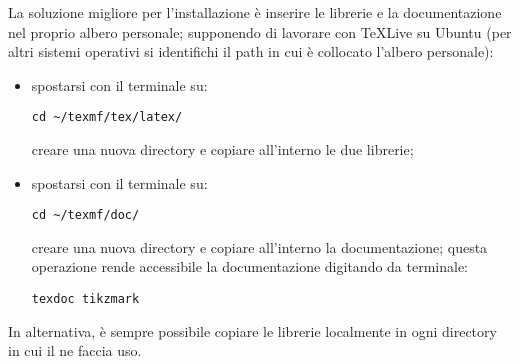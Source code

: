 La soluzione migliore per l'installazione è inserire le librerie e la documentazione nel proprio albero personale; supponendo di lavorare con \TeX Live su Ubuntu (per altri sistemi operativi si identifichi il path in cui è collocato l'albero personale):
\begin{itemize}
\item spostarsi con il terminale su:
\begin{verbatim}
cd ~/texmf/tex/latex/
\end{verbatim}
creare una nuova directory  e copiare all'interno le due librerie;
\item spostarsi con il terminale su:
\begin{verbatim}
cd ~/texmf/doc/
\end{verbatim}
creare una nuova directory  e copiare all'interno la documentazione; questa operazione rende accessibile la documentazione digitando da terminale:
\begin{verbatim}
texdoc tikzmark
\end{verbatim}
\end{itemize}
In alternativa, è sempre possibile copiare le librerie localmente in ogni directory in cui il  ne faccia uso.
